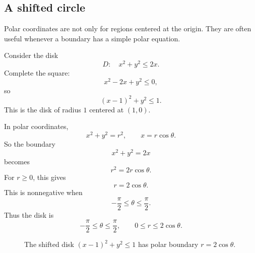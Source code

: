 \subsection{A shifted circle}

Polar coordinates are not only for regions centered at the origin.  They are often useful
whenever a boundary has a simple polar equation.

Consider the disk
\[
    D:\quad x^2+y^2\le2x.
\]
Complete the square:
\[
    x^2-2x+y^2\le0,
\]
so
\[
    (x-1)^2+y^2\le1.
\]
This is the disk of radius \(1\) centered at \((1,0)\).

In polar coordinates,
\[
    x^2+y^2=r^2,
    \qquad
    x=r\cos\theta.
\]
So the boundary
\[
    x^2+y^2=2x
\]
becomes
\[
    r^2=2r\cos\theta.
\]
For \(r\ge0\), this gives
\[
    r=2\cos\theta.
\]
This is nonnegative when
\[
    -\frac{\pi}{2}\le\theta\le\frac{\pi}{2}.
\]
Thus the disk is
\[
    -\frac{\pi}{2}\le\theta\le\frac{\pi}{2},
    \qquad
    0\le r\le2\cos\theta.
\]

\begin{figure}[h]
\centering
{}
\caption{The shifted disk \((x-1)^2+y^2\le1\) has polar boundary \(r=2\cos\theta\).}
\end{figure}

